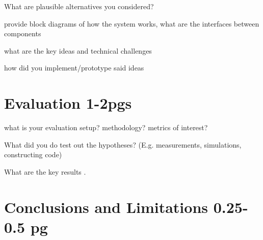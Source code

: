\documentclass[twocolumn,10pt]{article}
\begin{document}
What are plausible alternatives you considered?

provide block diagrams of how the system works, what are the interfaces between components

what are the key ideas and technical challenges

how did you implement/prototype said ideas

\section{Evaluation 1-2pgs}

what is your evaluation setup? methodology? metrics of interest?

What did you do  test out the hypotheses? (E.g.
measurements, simulations, constructing code)


What are the key results .


\section{Conclusions  and Limitations 0.25-0.5 pg}

 {
  \footnotesize
  \raggedright
  
  
 }

%
\end{document}
